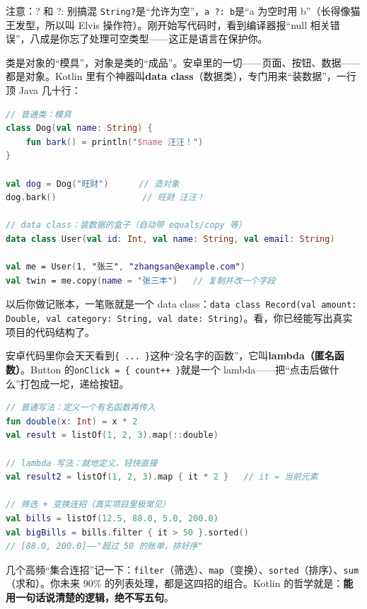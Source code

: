 \begin{tcbwarn}{注意：? 和 ?: 别搞混}
\texttt{String?}是“允许为空”，\texttt{a ?: b}是“a 为空时用 b”（长得像猫王发型，所以叫 Elvis 操作符）。刚开始写代码时，看到编译器报“null 相关错误”，八成是你忘了处理可空类型——这正是语言在保护你。

\end{tcbwarn}


类是对象的“模具”，对象是类的“成品”。安卓里的一切——页面、按钮、数据——都是对象。Kotlin 里有个神器叫\textbf{data class}（数据类），专门用来“装数据”，一行顶 Java 几十行：

\begin{lstlisting}[language=Kotlin]
// 普通类：模具
class Dog(val name: String) {
    fun bark() = println("$name 汪汪！")
}

val dog = Dog("旺财")      // 造对象
dog.bark()                 // 旺财 汪汪！

// data class：装数据的盒子（自动带 equals/copy 等）
data class User(val id: Int, val name: String, val email: String)

val me = User(1, "张三", "zhangsan@example.com")
val twin = me.copy(name = "张三丰")   // 复制并改一个字段
\end{lstlisting}

以后你做记账本，一笔账就是一个 data class：\texttt{data class Record(val amount: Double, val category: String, val date: String)}。看，你已经能写出真实项目的代码结构了。


安卓代码里你会天天看到\texttt{\{ ... \}}这种“没名字的函数”，它叫\textbf{lambda（匿名函数）}。Button 的\texttt{onClick = \{ count++ \}}就是一个 lambda——把“点击后做什么”打包成一坨，递给按钮。

\begin{lstlisting}[language=Kotlin]
// 普通写法：定义一个有名函数再传入
fun double(x: Int) = x * 2
val result = listOf(1, 2, 3).map(::double)

// lambda 写法：就地定义，轻快直接
val result2 = listOf(1, 2, 3).map { it * 2 }   // it = 当前元素

// 筛选 + 变换连招（真实项目里极常见）
val bills = listOf(12.5, 88.0, 5.0, 200.0)
val bigBills = bills.filter { it > 50 }.sorted()
// [88.0, 200.0]——"超过 50 的账单，排好序"
\end{lstlisting}

几个高频“集合连招”记一下：\texttt{filter}（筛选）、\texttt{map}（变换）、\texttt{sorted}（排序）、\texttt{sum}（求和）。你未来 90\% 的列表处理，都是这四招的组合。Kotlin 的哲学就是：\textbf{能用一句话说清楚的逻辑，绝不写五句}。

